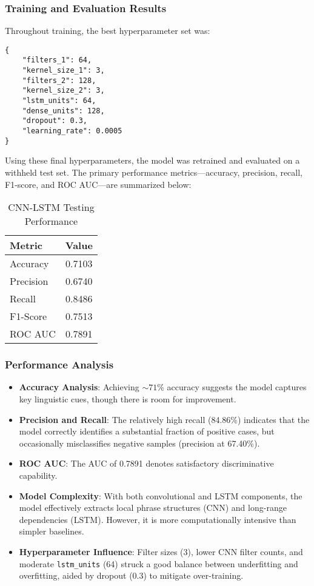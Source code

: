 \subsubsection{Training and Evaluation Results}

Throughout training, the best hyperparameter set was:

\begin{verbatim}
{
    "filters_1": 64,
    "kernel_size_1": 3,
    "filters_2": 128,
    "kernel_size_2": 3,
    "lstm_units": 64,
    "dense_units": 128,
    "dropout": 0.3,
    "learning_rate": 0.0005
}
\end{verbatim}

Using these final hyperparameters, the model was retrained and evaluated on a withheld test set. The primary performance metrics—accuracy, precision, recall, F1-score, and ROC AUC—are summarized below:

\begin{table}[H]
\centering
\caption{CNN-LSTM Testing Performance}
\label{tab:lstm-testing-metrics}
\begin{tabular}{|l|c|}
\hline
\textbf{Metric} & \textbf{Value} \\ \hline
Accuracy & 0.7103 \\
Precision & 0.6740 \\
Recall & 0.8486 \\
F1-Score & 0.7513 \\
ROC AUC & 0.7891 \\
\hline
\end{tabular}
\end{table}

\subsubsection{Performance Analysis}

\begin{itemize}
    \item \textbf{Accuracy Analysis}: Achieving $\sim71\%$ accuracy suggests the model captures key linguistic cues, though there is room for improvement.
    \item \textbf{Precision and Recall}: The relatively high recall (84.86\%) indicates that the model correctly identifies a substantial fraction of positive cases, but occasionally misclassifies negative samples (precision at 67.40\%).
    \item \textbf{ROC AUC}: The AUC of 0.7891 denotes satisfactory discriminative capability.
    \item \textbf{Model Complexity}: With both convolutional and LSTM components, the model effectively extracts local phrase structures (CNN) and long-range dependencies (LSTM). However, it is more computationally intensive than simpler baselines.
    \item \textbf{Hyperparameter Influence}: Filter sizes (3), lower CNN filter counts, and moderate \texttt{lstm\_units} (64) struck a good balance between underfitting and overfitting, aided by dropout (0.3) to mitigate over-training.
\end{itemize}

